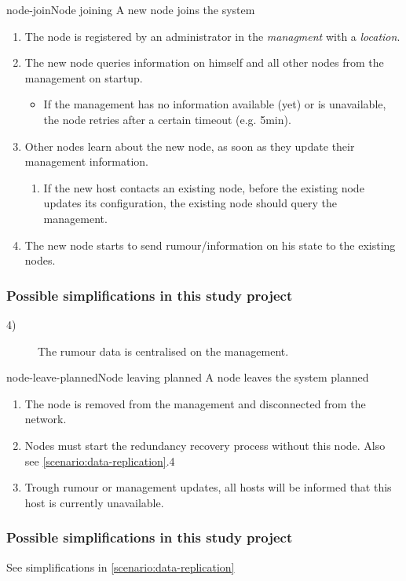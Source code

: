 \begin{scenario}{node-join}{Node joining}
    A new node joins the system
    
    \begin{enumerate}
    	\item The node is registered by an administrator in the \emph{managment} with a \emph{location}.
    	\item The new node queries information on himself and all other nodes from the management on startup.
    		\begin{itemize}
    			\item If the management has no information available (yet) or is unavailable, the node retries after a certain timeout (e.g. 5min).
    		\end{itemize}
    	\item Other nodes learn about the new node, as soon as they update their management information.
    		\begin{enumerate}
    			\item If the new host contacts an existing node, before the existing node updates its configuration, the existing node should query the management.
    		\end{enumerate}
    	\item The new node starts to send rumour/information on his state to the existing nodes.
    \end{enumerate}
    
	\subsubsection{Possible simplifications in this study project}
	\begin{description}
		 \item[4)] The rumour data is centralised on the management.
	\end{description}
\end{scenario}

\begin{scenario}{node-leave-planned}{Node leaving planned}
    A node leaves the system planned
    \begin{enumerate}
    	\item The node is removed from the management and disconnected from the network.
    	\item Nodes must start the redundancy recovery process without this node.
    		Also see \ref{scenario:data-replication}.4
    	\item Trough rumour or management updates, all hosts will be informed that this host is currently unavailable.
    \end{enumerate}
    
	\subsubsection{Possible simplifications in this study project}
		See simplifications in \ref{scenario:data-replication}
\end{scenario}

